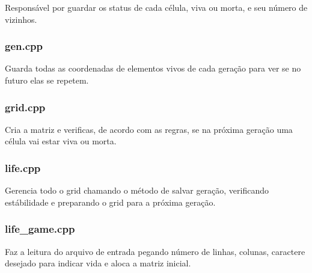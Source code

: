 Responsável por guardar os status de cada célula, viva ou morta, e seu número de vizinhos.

\subsubsection*{gen.\+cpp}

Guarda todas as coordenadas de elementos vivos de cada geração para ver se no futuro elas se repetem.

\subsubsection*{grid.\+cpp}

Cria a matriz e verificas, de acordo com as regras, se na próxima geração uma célula vai estar viva ou morta.

\subsubsection*{life.\+cpp}

Gerencia todo o grid chamando o método de salvar geração, verificando estábilidade e preparando o grid para a próxima geração.

\subsubsection*{life\+\_\+game.\+cpp}

Faz a leitura do arquivo de entrada pegando número de linhas, colunas, caractere desejado para indicar vida e aloca a matriz inicial. 